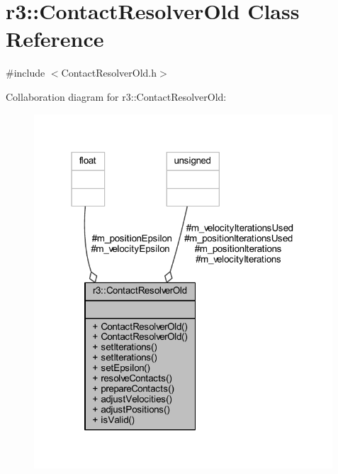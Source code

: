 \hypertarget{classr3_1_1_contact_resolver_old}{}\section{r3\+:\+:Contact\+Resolver\+Old Class Reference}
\label{classr3_1_1_contact_resolver_old}


{\ttfamily \#include $<$Contact\+Resolver\+Old.\+h$>$}



Collaboration diagram for r3\+:\+:Contact\+Resolver\+Old\+:\nopagebreak
\begin{figure}[H]
\begin{center}
\leavevmode
\includegraphics[width=316pt]{classr3_1_1_contact_resolver_old__coll__graph}
\end{center}
\end{figure}
